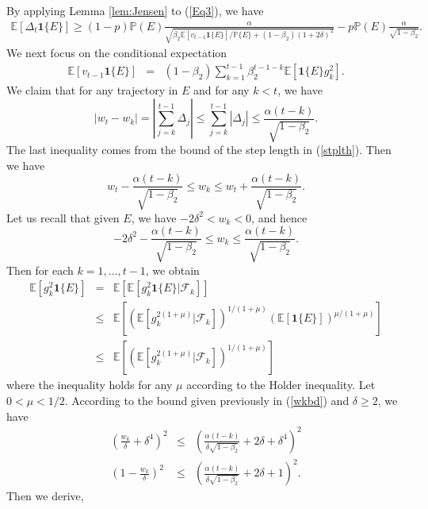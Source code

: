 \documentclass[twoside]{article}
\def\EE{\mathbb{E}}
\def\PP{\mathbb{P}}
\def\FF{\mathcal{F}}
\begin{document}
By applying Lemma \ref{lem:Jensen} to (\ref{Eq3}), we have
\begin{eqnarray}
\EE[\Delta_t\mathbf{1}\{E\}] \geq (1-p)\PP(E)\frac{\alpha}{\sqrt{\beta_2 \EE[v_{t-1} \mathbf{1}\{E\}]/\PP\{E\} +(1-\beta_2)(1+2\delta)^2 }} - p\PP(E)\frac{\alpha}{\sqrt{1-\beta_2}}.\nonumber
\end{eqnarray}
We next focus on the conditional expectation
\begin{eqnarray}
\EE\left[v_{t-1}\mathbf{1}\{E\}\right]
&=&  (1-\beta_2)\sum_{k=1}^{t-1}\beta_2^{t-1-k}\EE\left[\mathbf{1}\{E\} g_k^2\right]. \nonumber
\end{eqnarray}
We claim that for any trajectory in $E$ and for any $k<t$, we have
$$\left|w_t-w_k\right| = \left|\sum_{j=k}^{t-1}\Delta_j \right| \leq \sum_{j=k}^{t-1}\left|\Delta_j\right| \leq \frac{\alpha(t-k)}{\sqrt{1-\beta_2}}.  $$
The last inequality comes from the bound of the step length in (\ref{stplth}). Then we have
$$ w_t - \frac{\alpha(t-k)}{\sqrt{1-\beta_2}}\leq w_k \leq w_t + \frac{\alpha(t-k)}{\sqrt{1-\beta_2}}.$$
Let us recall that given $E$, we have $-2\delta ^2 < w_k < 0$, and hence
\begin{equation}
\label{wkbd}
    -2\delta^2 - \frac{\alpha(t-k)}{\sqrt{1-\beta_2}}\leq w_k \leq  \frac{\alpha(t-k)}{\sqrt{1-\beta_2}}.
\end{equation} 
Then for each $k=1,\ldots,t-1$, we obtain
\begin{eqnarray}
\EE \left[g_k ^2 \mathbf{1}\{E\}\right] &=&  \EE\left[\EE[g_k^2\mathbf{1}\{E\} \left|\FF_k\right.]\right]\nonumber\\
&\leq& \EE\left[\left(\EE\left[ g_k^{2(1+\mu)}|\FF_k \right]\right)^{1/(1+\mu)}\left(\EE \left[ \mathbf{1}\{E\}\right]\right)^{\mu/(1+\mu)} \right]\nonumber\\
&\leq& \EE\left[\left(\EE\left[ g_k^{2(1+\mu)}|\FF_k \right]\right)^{1/(1+\mu)} \right]\nonumber
\end{eqnarray}
where the inequality holds for any $\mu$ according to the Holder inequality. Let $0<\mu<1/2$. According to the bound given previously in (\ref{wkbd}) and $\delta \geq 2$, we have
\begin{eqnarray}
\left( \frac{w_k}{\delta} + \delta^4 \right)^2 &\leq& \left( \frac{\alpha(t-k)}{\delta \sqrt{1-\beta_2}} + 2 \delta + \delta^4\right)^2\nonumber\\
\left( 1- \frac{w_k}{\delta}\right)^2 &\leq& \left( \frac{\alpha(t-k)}{\delta \sqrt{1-\beta_2}} + 2\delta + 1\right)^2.\nonumber
\end{eqnarray} 
Then we derive, 
\end{document}
